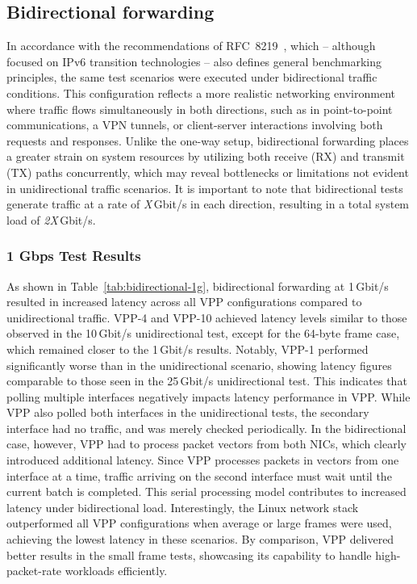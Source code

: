 \subsection{Bidirectional forwarding}

In accordance with the recommendations of RFC~8219~\cite{RFC8219}, which -- although focused on IPv6 transition technologies -- 
also defines general benchmarking principles, the same test scenarios were executed under bidirectional traffic conditions.  
This configuration reflects a more realistic networking environment where traffic flows simultaneously in both directions, such as in point-to-point communications,
a VPN tunnels, or client-server interactions involving both requests and responses.  
Unlike the one-way setup, bidirectional forwarding places a greater strain on system resources by utilizing both receive (RX) and transmit (TX) paths concurrently, 
which may reveal bottlenecks or limitations not evident in unidirectional traffic scenarios.
It is important to note that bidirectional tests generate traffic at a rate of \textit{X}\,Gbit/s in each direction, resulting in a total system load of \textit{2X}\,Gbit/s.

\subsubsection{1 Gbps Test Results}

As shown in Table~\ref{tab:bidirectional-1g}, bidirectional forwarding at 1\,Gbit/s resulted in increased latency across all VPP configurations compared to unidirectional traffic. 
VPP-4 and VPP-10 achieved latency levels similar to those observed in the 10\,Gbit/s unidirectional test, except for the 64-byte frame case, which remained closer to the 1\,Gbit/s results.
Notably, VPP-1 performed significantly worse than in the unidirectional scenario, showing latency figures comparable to those seen in the 25\,Gbit/s unidirectional test. 
This indicates that polling multiple interfaces negatively impacts latency performance in VPP.
While VPP also polled both interfaces in the unidirectional tests, the secondary interface had no traffic, and was merely checked periodically. 
In the bidirectional case, however, VPP had to process packet vectors from both NICs, which clearly introduced additional latency. 
Since VPP processes packets in vectors from one interface at a time, traffic arriving on the second interface must wait until the current batch is completed. 
This serial processing model contributes to increased latency under bidirectional load.
Interestingly, the Linux network stack outperformed all VPP configurations when average or large frames were used, achieving the lowest latency in these scenarios. 
By comparison, VPP delivered better results in the small frame tests, showcasing its capability to handle high-packet-rate workloads efficiently.

